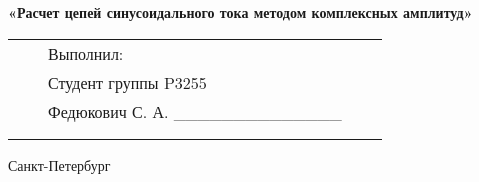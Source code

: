 \documentclass[12pt]{article}
\begin{document}
\begin{center}
        \large
        \par\bigskip
        \textbf{«Расчет цепей синусоидального тока методом комплексных амплитуд»}
        \par\bigskip\par\bigskip\par\bigskip\par\bigskip\par\bigskip\par\bigskip
        \par\bigskip\par\bigskip\par\bigskip\par\bigskip\par\bigskip\par\bigskip
        \par\bigskip\par\bigskip\par\bigskip\par\bigskip\par\bigskip\par\bigskip
        \normalsize
        \begin{tabular}{lllll}
            \hspace{170pt}	 							& \hspace{80pt}	&	Выполнил:								&\\
            &			&	Студент группы P3255					&\\
            & 			&	Федюкович С. А. \_\_\_\_\_\_\_\_\_\_\_\_\_\_	&\\
            &			&										&\\
            &			&										&\\
        \end{tabular}
        \par\bigskip\par\bigskip\par\bigskip
        \par\bigskip \par\bigskip
        \par\bigskip\par\bigskip\par\bigskip\par\bigskip\par\bigskip\par\bigskip\par\bigskip\par\bigskip

        Санкт-Петербург
        \par{}
    \end{center}
    \newpage
    \pagestyle{plain}
    \setcounter{page}{1}
\end{document}
